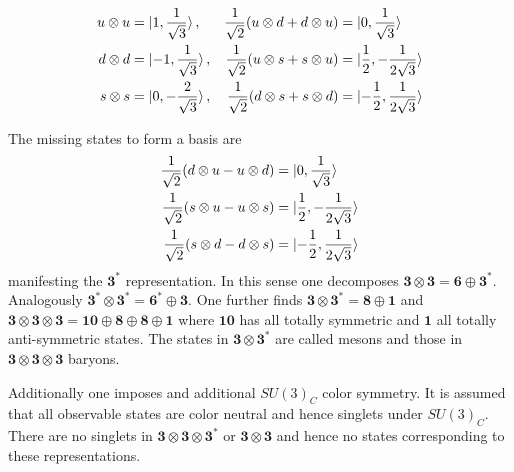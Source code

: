 \begin{subequations}
    \begin{align}
         &  & u\otimes u & ={\lvert1,\frac{1}{\sqrt{3}}\rangle}\,,  & \frac{1}{\sqrt{2}}(u\otimes d+d\otimes u) & ={\lvert0,\frac{1}{\sqrt{3}}\rangle}             &  & \\
         &  & d\otimes d & ={\lvert-1,\frac{1}{\sqrt{3}}\rangle}\,, & \frac{1}{\sqrt{2}}(u\otimes s+s\otimes u) & ={\lvert\frac{1}{2},-\frac{1}{2\sqrt{3}}\rangle} &  & \\
         &  & s\otimes s & ={\lvert0,-\frac{2}{\sqrt{3}}\rangle}\,, & \frac{1}{\sqrt{2}}(d\otimes s+s\otimes d) & ={\lvert-\frac{1}{2},\frac{1}{2\sqrt{3}}\rangle} &  & \\
    \end{align}
\end{subequations}

The missing states to form a basis are
\begin{subequations}
    \begin{align}
        \frac{1}{\sqrt{2}}(d\otimes u-u\otimes d) & ={\lvert0,\frac{1}{\sqrt{3}}\rangle}             \\
        \frac{1}{\sqrt{2}}(s\otimes u-u\otimes s) & ={\lvert\frac{1}{2},-\frac{1}{2\sqrt{3}}\rangle} \\
        \frac{1}{\sqrt{2}}(s\otimes d-d\otimes s) & ={\lvert-\frac{1}{2},\frac{1}{2\sqrt{3}}\rangle} \\
    \end{align}
\end{subequations}
manifesting the $\mathbf{3}^*$ representation.  In this sense one decomposes $\mathbf{3}\otimes\mathbf{3}=\mathbf{6}\oplus\mathbf{3}^*$. Analogously $\mathbf{3}^*\otimes\mathbf{3}^*=\mathbf{6}^*\oplus\mathbf{3}$. One further finds $\mathbf{3}\otimes\mathbf{3}^*=\mathbf{8}\oplus\mathbf{1}$ and $\mathbf{3}\otimes\mathbf{3}\otimes\mathbf{3}=\mathbf{10}\oplus\mathbf{8}\oplus\mathbf{8}\oplus\mathbf{1}$ where $\mathbf{10}$ has all totally symmetric and $\mathbf{1}$ all totally anti-symmetric states. The states in $\mathbf{3}\otimes\mathbf{3}^*$ are called mesons and those in $\mathbf{3}\otimes\mathbf{3}\otimes\mathbf{3}$ baryons.

Additionally one imposes and additional $SU(3)_C$ color symmetry. It is assumed that all observable states are color neutral and hence singlets under $SU(3)_C$. There are no singlets in $\mathbf{3}\otimes\mathbf{3}\otimes\mathbf{3}^*$ or $\mathbf{3}\otimes\mathbf{3}$ and hence no states corresponding to these representations. 

